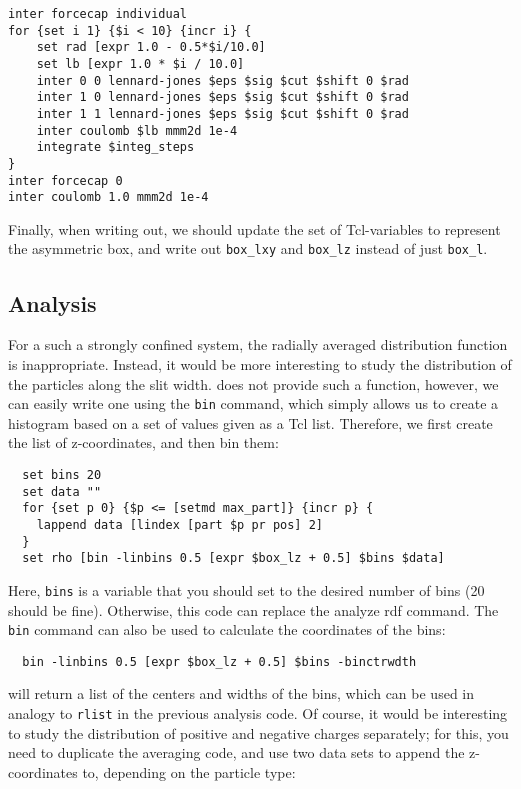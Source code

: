 \documentclass[
a4paper,                        %
11pt,                           %
twoside,                        %
footsepline,                    %
headsepline,                    %
headexclude,                    %
footexclude,                    %
pagesize,                       %
]{scrartcl}
\begin{document}
\begin{lstlisting}
inter forcecap individual
for {set i 1} {$i < 10} {incr i} {
    set rad [expr 1.0 - 0.5*$i/10.0]
    set lb [expr 1.0 * $i / 10.0]
    inter 0 0 lennard-jones $eps $sig $cut $shift 0 $rad
    inter 1 0 lennard-jones $eps $sig $cut $shift 0 $rad
    inter 1 1 lennard-jones $eps $sig $cut $shift 0 $rad
    inter coulomb $lb mmm2d 1e-4
    integrate $integ_steps
}
inter forcecap 0
inter coulomb 1.0 mmm2d 1e-4  
\end{lstlisting}

Finally, when writing out, we should update the set of
Tcl-variables to represent the asymmetric box, and write out
\verb|box_lxy| and \verb|box_lz| instead of just \verb|box_l|.

\subsection*{Analysis}

For a such a strongly confined system, the radially averaged
distribution function is inappropriate. Instead, it would be more
interesting to study the distribution of the particles along the slit
width. \es{}  does not provide such a function, however, we can easily
write one using the \verb|bin| command, which simply allows us 
to create a histogram based on a set of values given as a Tcl list.
Therefore, we first create the list
of z-coordinates, and then bin them:

\begin{lstlisting}
  set bins 20
  set data ""
  for {set p 0} {$p <= [setmd max_part]} {incr p} {
    lappend data [lindex [part $p pr pos] 2]
  }
  set rho [bin -linbins 0.5 [expr $box_lz + 0.5] $bins $data]
\end{lstlisting}

Here, \verb|bins| is a variable that you should set to the desired
number of bins (20 should be fine). Otherwise, this code can replace
the analyze rdf command. The \verb|bin| command can also be used to
calculate the coordinates of the bins:

\begin{lstlisting}
  bin -linbins 0.5 [expr $box_lz + 0.5] $bins -binctrwdth
\end{lstlisting}

will return a list of the centers and widths of the bins, which can be
used in analogy to \verb|rlist| in the previous analysis code. Of
course, it would be interesting to study the distribution of positive
and negative charges separately; for this, you need to duplicate the
averaging code, and use two data sets to append the z-coordinates to,
depending on the particle type:
\end{document}
